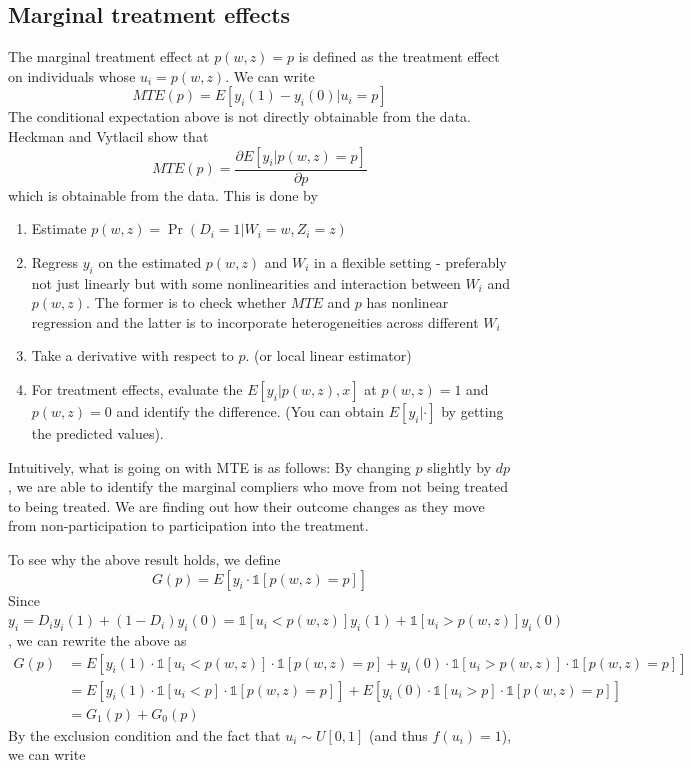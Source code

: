 \documentclass[12pt]{article}
\theoremstyle{definition}
\theoremstyle{property}
\theoremstyle{assumption}
\theoremstyle{example}
\theoremstyle{comment}
\begin{document}
\subsection{Marginal treatment effects}
The marginal treatment effect at $p(w,z)=p$ is defined as the treatment effect on individuals whose $u_i=p(w,z)$. We can write
\[
MTE(p)=E[y_i(1)-y_i(0)| u_i=p]
\]
The conditional expectation above is not directly obtainable from the data. Heckman and Vytlacil show that 
\[
MTE(p)=\frac{\partial E[y_i | p(w,z)=p]}{\partial p}
\]
which is obtainable from the data. This is done by 
\begin{enumerate}
\item Estimate $p(w,z)=\Pr(D_i=1|W_i=w, Z_i=z)$
\item Regress $y_i$ on the estimated $p(w, z)$ and $W_i$ in a flexible setting - preferably not just linearly but with some nonlinearities and interaction between $W_i$ and $p(w,z)$. The former is to check whether $MTE$ and $p$ has nonlinear regression and the latter is to incorporate heterogeneities across different $W_i$
\item Take a derivative with respect to $p$. (or local linear estimator)
\item For treatment effects, evaluate the $E[y_i|p(w,z),x]$ at $p(w,z)=1$ and $p(w,z)=0$ and identify the difference. (You can obtain $E[y_i|\cdot]$ by getting the predicted values).  
\end{enumerate}
\par
Intuitively, what is going on with MTE is as follows: By changing $p$ slightly by $dp$, we are able to identify the marginal compliers who move from not being treated to being treated. We are finding out how their outcome changes as they move from non-participation to participation into the treatment. \par
To see why the above result holds, we define
\[
G(p)=E[y_i\cdot \mathbb{1}[p(w,z)=p]]
\]
Since $y_i=D_iy_i(1)+(1-D_i)y_i(0)=\mathbb{1}[u_i<p(w,z)]y_i(1)+\mathbb{1}[u_i>p(w,z)]y_i(0)$, we can rewrite the above as
\begin{align*}
G(p)&=E[y_i(1)\cdot \mathbb{1}[u_i<p(w,z)]\cdot \mathbb{1}[p(w,z)=p]+y_i(0)\cdot \mathbb{1}[u_i>p(w,z)]\cdot \mathbb{1}[p(w,z)=p]]\\
&=E[y_i(1)\cdot \mathbb{1}[u_i<p]\cdot \mathbb{1}[p(w,z)=p]]+E[y_i(0)\cdot \mathbb{1}[u_i>p]\cdot \mathbb{1}[p(w,z)=p]]\\
&=G_1(p)+G_0(p)
\end{align*}
By the exclusion condition and the fact that $u_i\sim U[0,1]$ (and thus $f(u_i)=1$), we can write
\end{document}
